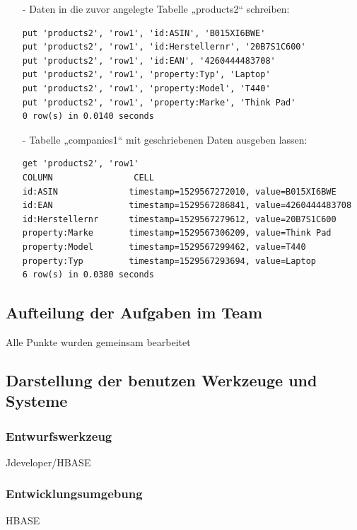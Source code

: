 \begin{itemize}
\item[-] Daten in die zuvor angelegte Tabelle „products2“ schreiben:
\begin{lstlisting}
put 'products2', 'row1', 'id:ASIN', 'B015XI6BWE'
put 'products2', 'row1', 'id:Herstellernr', '20B7S1C600'
put 'products2', 'row1', 'id:EAN', '4260444483708'
put 'products2', 'row1', 'property:Typ', 'Laptop'
put 'products2', 'row1', 'property:Model', 'T440'
put 'products2', 'row1', 'property:Marke', 'Think Pad'
0 row(s) in 0.0140 seconds
\end{lstlisting}

\item[-] Tabelle „companies1“ mit geschriebenen Daten ausgeben lassen:
\begin{lstlisting}
get 'products2', 'row1'
COLUMN                CELL
id:ASIN              timestamp=1529567272010, value=B015XI6BWE
id:EAN               timestamp=1529567286841, value=4260444483708
id:Herstellernr      timestamp=1529567279612, value=20B7S1C600
property:Marke       timestamp=1529567306209, value=Think Pad
property:Model       timestamp=1529567299462, value=T440
property:Typ         timestamp=1529567293694, value=Laptop
6 row(s) in 0.0380 seconds
\end{lstlisting}
\end{itemize}
\subsection{Aufteilung der Aufgaben im Team}
Alle Punkte wurden gemeinsam bearbeitet
\subsection{Darstellung der benutzen Werkzeuge und Systeme}

\subsubsection*{Entwurfswerkzeug}
Jdeveloper/HBASE
\subsubsection*{Entwicklungsumgebung}
HBASE
